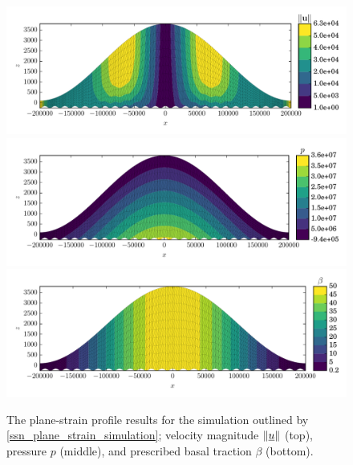 \begin{figure}
  \centering

    \includegraphics[width=\linewidth]{images/momentum/plane_strain/U_mag.pdf}
    \includegraphics[width=\linewidth]{images/momentum/plane_strain/p.pdf}
    \includegraphics[width=\linewidth]{images/momentum/plane_strain/beta.pdf}

  \caption[Plane-strain momentum experiment solution]{The plane-strain profile results for the simulation outlined by \cref{ssn_plane_strain_simulation}; velocity magnitude $\Vert \underline{u} \Vert$ (top), pressure $p$ (middle), and prescribed basal traction $\beta$ (bottom).}
  \label{plane_strain_image}
\end{figure}
